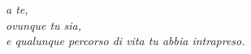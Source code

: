 %
%
\cleardoublepage
%
%
\thispagestyle{empty}
%
%
%
\begin{flushright}
\textit{a te,\\ovunque tu sia,\\e qualunque percorso di vita tu abbia intrapreso.}
\end{flushright}
%
%
